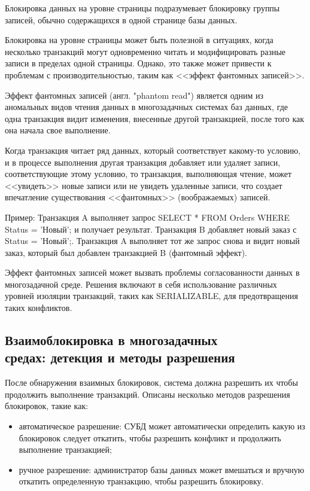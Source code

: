 Блокировка данных на уровне страницы подразумевает блокировку группы записей, обычно содержащихся в одной странице базы данных.

Блокировка на уровне страницы может быть полезной в ситуациях, когда несколько транзакций могут одновременно читать и модифицировать разные записи в пределах одной страницы. 
Однако, это также может привести к проблемам с производительностью, таким как <<эффект фантомных записей>>.

Эффект фантомных записей (англ. "phantom read") является одним из аномальных видов чтения данных в многозадачных системах баз данных, где одна транзакция видит изменения, внесенные другой транзакцией, после того как она начала свое выполнение.

Когда транзакция читает ряд данных, который соответствует какому-то условию, и в процессе выполнения другая транзакция добавляет или удаляет записи, соответствующие этому условию, то транзакция, выполняющая чтение, может <<увидеть>> новые записи или не увидеть удаленные записи, что создает впечатление существования <<фантомных>> (воображаемых) записей.

Пример: Транзакция A выполняет запрос SELECT * FROM Orders WHERE Status = 'Новый'; и получает результат.
Транзакция B добавляет новый заказ с Status = 'Новый';.
Транзакция A выполняет тот же запрос снова и видит новый заказ, который был добавлен транзакцией B (фантомный эффект).

Эффект фантомных записей может вызвать проблемы согласованности данных в многозадачной среде. Решения включают в себя использование различных уровней изоляции транзакций, таких как SERIALIZABLE, для предотвращения таких конфликтов.

\subsection{Взаимоблокировка в многозадачных\\средах: детекция и методы разрешения}

После обнаружения взаимных блокировок, система должна разрешить их чтобы продолжить выполнение транзакций. 
Описаны несколько методов разрешения блокировок, такие как:

\begin{itemize}
	\item автоматическое разрешение: СУБД может автоматически определить какую из блокировок следует откатить, чтобы разрешить конфликт и продолжить выполнение транзакцией;
	\item ручное разрешение: администратор базы данных может вмешаться и вручную откатить определенную транзакцию, чтобы разрешить блокировку.
\end{itemize}


